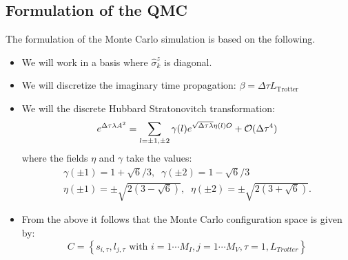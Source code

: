 \subsection{Formulation of the QMC}  
The formulation of the  Monte Carlo simulation is based on the following.
\begin{itemize}
\item  We will work in  a basis  where  $\hat{\sigma}^z_k$ is diagonal. 
\item  We will discretize the imaginary time propagation: $\beta = \Delta \tau L_{\text{Trotter}} $
\item  We will the   discrete Hubbard Stratonovitch transformation: 
\begin{equation}
\label{HS_squares}
        e^{\Delta \tau  \lambda  A^2 } =
        \sum_{ l = \pm 1, \pm 2}  \gamma(l)
e^{ \sqrt{\Delta \tau \lambda }
       \eta(l)  O }
                + {\cal O} (\Delta \tau ^4)
\end{equation}
where the fields $\eta$ and $\gamma$ take the values:
\begin{eqnarray}
 \gamma(\pm 1) = 1 + \sqrt{6}/3, \; \; \gamma(\pm 2) = 1 - \sqrt{6}/3
\nonumber \\
 \eta(\pm 1 ) = \pm \sqrt{2 \left(3 - \sqrt{6} \right)},  \; \;
 \eta(\pm 2 ) = \pm \sqrt{2 \left(3 + \sqrt{6} \right)}.
\nonumber
\end{eqnarray}
\item From the above it follows that   the Monte Carlo configuration space is given by: 
\begin{equation}
	C = \left\{   s_{i,\tau} ,  l_{j,\tau}  \text{ with }  i=1\cdots M_I,  j = 1\cdots M_V,  \tau=1,L_{Trotter}  \right\}
\end{equation}
\end{itemize}

